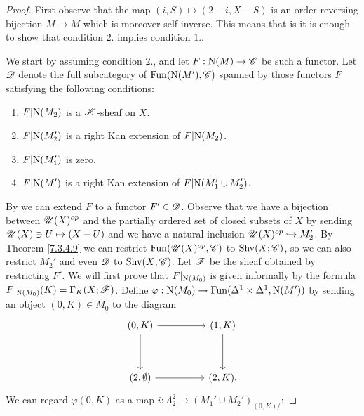 \documentclass[../../thesis.tex]{subfiles}
\begin{document}
\begin{proof}
    First observe that the map $(i,S) \mapsto (2-i, X-S)$ is an order-reversing bijection $M\to M$ which is moreover self-inverse.
    This means that is it is enough to show that condition $2.$ implies condition $1.$.


    We start by assuming condition $2.$, and let $F: \mathrm{N}(M) \to \mathscr{C}$ be such a functor.
    Let $\mathscr{D}$ denote the full subcategory of $\mathrm{Fun}(\mathrm{N}(M'), \mathscr{C})$ spanned by those functors $F$ satisfying the following conditions:
    \begin{enumerate}
        \item $F|\mathrm{N}(M_2)$ is a $\mathscr{K}$-sheaf on $X$.
        \item $F|\mathrm{N}(M'_2)$ is a right Kan extension of $F|\mathrm{N}(M_2)$.
        \item $F|\mathrm{N}(M'_1)$ is zero.
        \item $F|\mathrm{N}(M')$ is a right Kan extension of $F|\mathrm{N}(M'_1 \cup M'_2)$.
    \end{enumerate}
    By \cite[Proposition 4.3.2.15]{HTT} we can extend $F$ to a functor $F' \in \mathscr{D}$.
    Observe that we have a bijection between $\mathscr{U}(X)^{op}$ and the partially ordered set of closed subsets of $X$ by sending $\mathscr{U}(X) \ni U \mapsto (X - U)$ and we have a natural inclusion $\mathscr{U}(X)^{op} \hookrightarrow M_2'$.
    By Theorem \ref{7.3.4.9} we can restrict $\mathrm{Fun}(\mathscr{U}(X)^{op}, \mathscr{C})$ to $\mathrm{Shv}(X;\mathscr{C})$, so we can also restrict $M_2'$ and even $\mathscr{D}$ to $\mathrm{Shv}(X;\mathscr{C})$.
    Let $\mathscr{F}$ be the sheaf obtained by restricting $F'$. We will first prove that $F|_{\mathrm{N}(M_0)}$ is given informally by the formula $F|_{\mathrm{N}(M_0)}(K)=\Gamma_K(X;\mathscr{F})$.
    Define $\varphi:\mathrm{N}(M_0) \to \mathrm{Fun}(\Delta^1\times \Delta^1, \mathrm{N}(M'))$ by sending an object $(0,K) \in M_0$ to the diagram
    \[\begin{tikzcd}
            {(0,K)} && {(1,K)} \\
            \\
            {(2,\emptyset)} && {(2,K)}
            \arrow[from=1-1, to=1-3]
            \arrow[from=1-3, to=3-3]
            \arrow[from=3-1, to=3-3]
            \arrow[from=1-1, to=3-1].
        \end{tikzcd}\]
    We can regard $\varphi(0,K)$ as a map $i: \Lambda_2^2 \to (M_1'\cup M_2')_{(0,K)/}$:

\end{proof}
\end{document}
